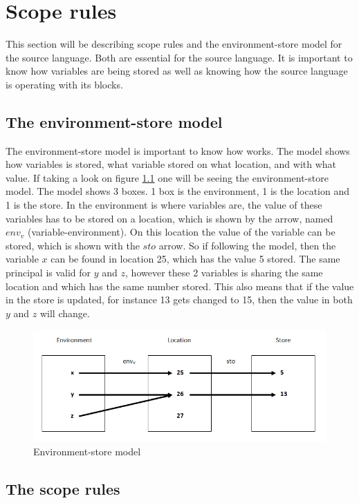 \chapter{Scope rules}\label{chap:scope-rules}
This section will be describing scope rules and the environment-store model for the source language. Both are essential for the source language. It is important to know how variables are being stored as well as knowing how the source language is operating with its blocks. 

\section{The environment-store model}\label{sec:es-model}
The environment-store model is important to know how works. The model shows how variables is stored, what variable stored on what location, and with what value. If taking a look on figure \ref{fig:esmodel} one will be seeing the environment-store model. The model shows 3 boxes. 1 box is the environment, 1 is the location and 1 is the store. In the environment is where variables are, the value of these variables has to be stored on a location, which is shown by the arrow, named $env_v$ (variable-environment). On this location the value of the variable can be stored, which is shown with the $sto$ arrow. So if following the model, then the variable $x$ can be found in location 25, which has the value 5 stored. The same principal is valid for $y$ and $z$, however these 2 variables is sharing the same location and which has the same number stored. This also means that if the value in the store is updated, for instance 13 gets changed to 15, then the value in both $y$ and $z$ will change. 
\begin{figure}[H]
\includegraphics{billeder/environment_store_model.png}
\caption{Environment-store model}
\label{fig:esmodel}
\end{figure}


\section{The scope rules}\label{sec:scope-rules}

